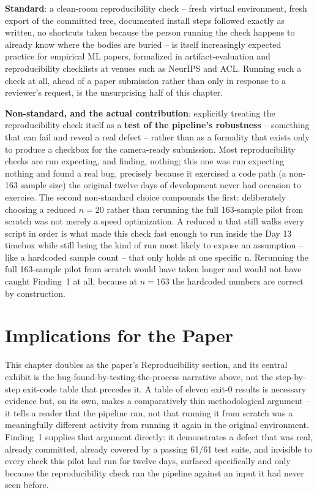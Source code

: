 \textbf{Standard}: a clean-room reproducibility check -- fresh virtual environment, fresh export of
the committed tree, documented install steps followed exactly as written, no shortcuts taken because
the person running the check happens to already know where the bodies are buried -- is itself
increasingly expected practice for empirical ML papers, formalized in artifact-evaluation and
reproducibility checklists at venues such as NeurIPS and ACL. Running such a check at all, ahead of a
paper submission rather than only in response to a reviewer's request, is the unsurprising half of
this chapter.

\textbf{Non-standard, and the actual contribution}: explicitly treating the reproducibility check
itself as a \textbf{test of the pipeline's robustness} -- something that can fail and reveal a real
defect -- rather than as a formality that exists only to produce a checkbox for the camera-ready
submission. Most reproducibility checks are run expecting, and finding, nothing; this one was run
expecting nothing and found a real bug, precisely because it exercised a code path (a non-163 sample
size) the original twelve days of development never had occasion to exercise. The second
non-standard choice compounds the first: deliberately choosing a reduced $n=20$ rather than rerunning
the full 163-sample pilot from scratch was not merely a speed optimization. A reduced n that still
walks every script in order is what made this check fast enough to run inside the Day 13 timebox
while still being the kind of run most likely to expose an assumption -- like a hardcoded sample
count -- that only holds at one specific n. Rerunning the full 163-sample pilot from scratch would
have taken longer and would not have caught Finding~1 at all, because at $n=163$ the hardcoded
numbers are correct by construction.

\section{Implications for the Paper}

This chapter doubles as the paper's Reproducibility section, and its central exhibit is the
bug-found-by-testing-the-process narrative above, not the step-by-step exit-code table that
precedes it. A table of eleven exit-0 results is necessary evidence but, on its own, makes a
comparatively thin methodological argument -- it tells a reader that the pipeline ran, not that
running it from scratch was a meaningfully different activity from running it again in the original
environment. Finding~1 supplies that argument directly: it demonstrates a defect that was real,
already committed, already covered by a passing 61/61 test suite, and invisible to every check this
pilot had run for twelve days, surfaced specifically and only because the reproducibility check ran
the pipeline against an input it had never seen before.

